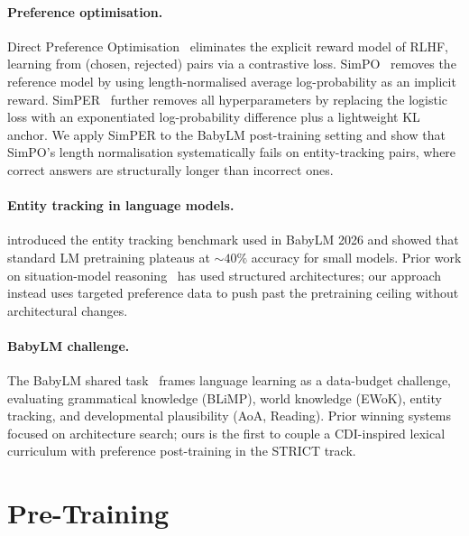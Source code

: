 \documentclass[11pt]{article}
\begin{document}
\paragraph{Preference optimisation.}
Direct Preference Optimisation~\citep{rafailov-etal-2023-dpo}
eliminates the explicit reward model of RLHF, learning from
(chosen, rejected) pairs via a contrastive loss.
SimPO~\citep{meng-etal-2024-simpo} removes the reference model
by using length-normalised average log-probability as an implicit
reward.
SimPER~\citep{simper2025} further removes all hyperparameters
by replacing the logistic loss with an exponentiated
log-probability difference plus a lightweight KL anchor.
We apply SimPER to the BabyLM post-training setting and
show that SimPO's length normalisation systematically
fails on entity-tracking pairs, where correct answers
are structurally longer than incorrect ones.

\paragraph{Entity tracking in language models.}
\citet{kim-schuster-2023} introduced the entity tracking benchmark
used in BabyLM 2026 and showed that standard LM pretraining
plateaus at ${\sim}40\%$ accuracy for small models.
Prior work on situation-model reasoning~\citep{henaff2021} has
used structured architectures; our approach instead uses
targeted preference data to push past the pretraining ceiling
without architectural changes.

\paragraph{BabyLM challenge.}
The BabyLM shared task~\citep{charpentier-etal-2025-findings,hu-etal-2024-findings}
frames language learning as a data-budget challenge, evaluating
grammatical knowledge (BLiMP), world knowledge (EWoK), entity
tracking, and developmental plausibility (AoA, Reading).
Prior winning systems focused on architecture search; ours is
the first to couple a CDI-inspired lexical curriculum with
preference post-training in the STRICT track.

\section{Pre-Training}
\label{sec:pretrain}
\end{document}
